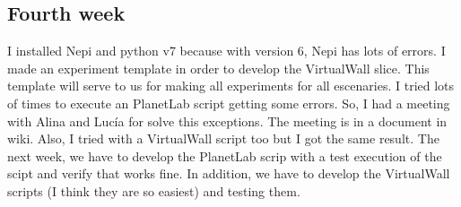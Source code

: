\subsection{Fourth week}
I installed Nepi\cite{Nepi} and python v7 because with version 6, Nepi has lots of errors.
I made an experiment template in order to develop the VirtualWall slice. This template will serve to us for making all experiments for all escenaries.
I tried lots of times to execute an PlanetLab\cite{PLE} script getting some errors. So, I had a meeting with Alina and Lucía for solve this exceptions.
The meeting is in a document in wiki.
Also, I tried with a VirtualWall script too but I got the same result.
The next week, we have to develop the PlanetLab scrip with a test execution of the scipt and verify that works fine.
In addition, we have to develop the VirtualWall scripts (I think they are so easiest) and testing them.
